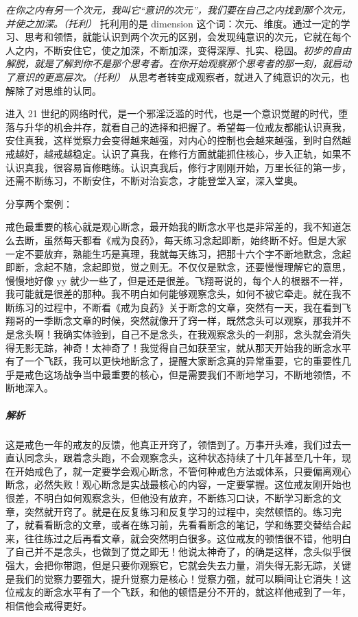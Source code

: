 \textit{在你之内有另一个次元，我叫它“意识的次元”，我们要在自己之内找到那个次元，并使之加深。（托利）} 托利用的是 dimension 这个词：次元、维度。通过一定的学习、思考和领悟，就能认识到两个次元的区别，会发现纯意识的次元，它就在每个人之内，不断安住它，使之加深，不断加深，变得深厚、扎实、稳固。\textit{初步的自由解脱，就是了解到你不是那个思考者。在你开始观察那个思考者的那一刻，就启动了意识的更高层次。（托利）} 从思考者转变成观察者，就进入了纯意识的次元，也解除了对思维的认同。

进入 21 世纪的网络时代，是一个邪淫泛滥的时代，也是一个意识觉醒的时代，堕落与升华的机会并存，就看自己的选择和把握了。希望每一位戒友都能认识真我，安住真我，这样觉察力会变得越来越强，对内心的控制也会越来越强，到时自然越戒越好，越戒越稳定。认识了真我，在修行方面就能抓住核心，步入正轨，如果不认识真我，很容易盲修瞎练。认识真我后，修行才刚刚开始，万里长征的第一步，还需不断练习，不断安住，不断对治妄念，才能登堂入室，深入堂奥。

分享两个案例：

\begin{case}
    戒色最重要的核心就是观心断念，最开始我的断念水平也是非常差的，我不知道怎么去断，虽然每天都看《戒为良药》，每天练习念起即断，始终断不好。但是大家一定不要放弃，熟能生巧是真理，我就每天练习，把那十六个字不断地默念，念起即断，念起不随，念起即觉，觉之则无。不仅仅是默念，还要慢慢理解它的意思，慢慢地好像 yy 就少一些了，但是还是很差。飞翔哥说的，每个人的根器不一祥，我可能就是很差的那种。我不明白如何能够观察念头，如何不被它牵走。就在我不断练习的过程中，不断看《戒为良药》关于断念的文章，突然有一天，我在看到飞翔哥的一季断念文章的时候，突然就像开了窍一样，既然念头可以观察，那我并不是念头啊！我确实体验到，自己不是念头，在我观察念头的一刹那，念头就会消失得无影无踪，神奇！太神奇了！我觉得自己如获至宝，就从那天开始我的断念水平有了一个飞跃，我可以更快地断念了，提醒大家断念真的异常重要，它的重要性几乎是戒色这场战争当中最重要的核心，但是需要我们不断地学习，不断地领悟，不断地深入。
    \subparagraph{解析} 这是戒色一年的戒友的反馈，他真正开窍了，领悟到了。万事开头难，我们过去一直认同念头，跟着念头跑，不会观察念头，这种状态持续了十几年甚至几十年，现在开始戒色了，就一定要学会观心断念，不管何种戒色方法或体系，只要偏离观心断念，必然失败！观心断念是实战最核心的内容，一定要掌握。这位戒友刚开始也很差，不明白如何观察念头，但他没有放弃，不断练习口诀，不断学习断念的文章，突然就开窍了。就是在反复练习和反复学习的过程中，突然顿悟的。练习完了，就看看断念的文章，或者在练习前，先看看断念的笔记，学和练要交替结合起来，往往练过之后再看文章，就会突然明白很多。这位戒友的顿悟很不错，他明白了自己并不是念头，也做到了觉之即无！他说太神奇了，的确是这样，念头似乎很强大，会把你带跑，但是只要你观察它，它就会失去力量，消失得无影无踪，关键是我们的觉察力要强大，提升觉察力是核心！觉察力强，就可以瞬间让它消失！这位戒友的断念水平有了一个飞跃，和他的顿悟是分不开的，就这样他戒到了一年，相信他会戒得更好。
\end{case}

